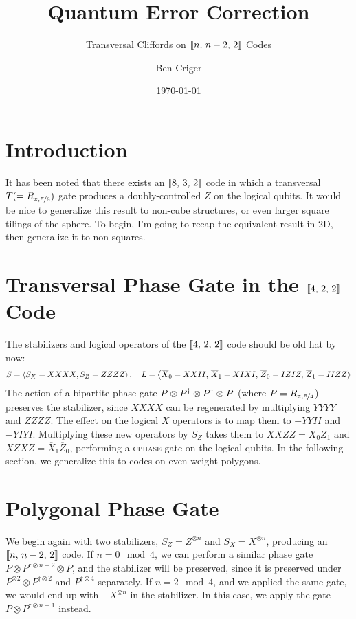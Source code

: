 \documentclass[a4paper, english]{scrartcl}
\title{Quantum Error Correction}
\subtitle{Transversal Cliffords on $\llbracket n,\,n-2,\,2 \rrbracket$ Codes}
\author{Ben Criger}
\date{\today}
\begin{document}
\maketitle
\section{Introduction}
It has been noted that there exists an $\llbracket 8,\,3,\,2 \rrbracket$ code in which a transversal $T (= R_{z,\nicefrac{\pi}{8}})$ gate produces a doubly-controlled $Z$ on the logical qubits. 
It would be nice to generalize this result to non-cube structures, or even larger square tilings of the sphere. 
To begin, I'm going to recap the equivalent result in 2D, then generalize it to non-squares. 

\section{Transversal Phase Gate in the $\llbracket 4,\,2,\,2 \rrbracket$ Code}
The stabilizers and logical operators of the $\llbracket 4,\,2,\,2 \rrbracket$ code should be old hat by now:
\begin{equation}
S = \left \langle S_X = XXXX, S_Z = ZZZZ \right \rangle, \quad L = \left \langle \overline{X}_0 = XXII,\, \overline{X}_1 = XIXI,\, \overline{Z}_0 = IZIZ,\, \overline{Z}_1 = IIZZ \right \rangle
\end{equation}
The action of a bipartite phase gate $P \otimes P^{\dagger} \otimes P^{\dagger} \otimes P $ (where $P = R_{z,\nicefrac{\pi}{4}}$) preserves the stabilizer, since $XXXX$ can be regenerated by multiplying $YYYY$ and $ZZZZ$. 
The effect on the logical $X$ operators is to map them to $-YYII$ and $-YIYI$.
Multiplying these new operators by $S_Z$ takes them to $XXZZ = \overline{X}_0 \overline{Z}_1$ and $XZXZ = \overline{X}_1 \overline{Z}_0$, performing a \textsc{cphase} gate on the logical qubits. 
In the following section, we generalize this to codes on even-weight polygons.

\section{Polygonal Phase Gate}
We begin again with two stabilizers, $S_Z = Z^{\otimes n}$  and $S_X = X^{\otimes n}$, producing an $\llbracket n,\,n-2,\,2 \rrbracket$ code. 
If $n=0\mod 4$, we can perform a similar phase gate $P \otimes P^{\dagger \otimes n - 2} \otimes P $, and the stabilizer will be preserved, since it is preserved under $P^{\otimes 2} \otimes P^{\dagger \otimes 2}$ and $P^{\dagger \otimes 4}$ separately. 
If $n=2\mod 4$, and we applied the same gate, we would end up with $-X^{\otimes n}$ in the stabilizer.
In this case, we apply the gate $P \otimes P^{\dagger \otimes n - 1}$ instead. 
\end{document}
